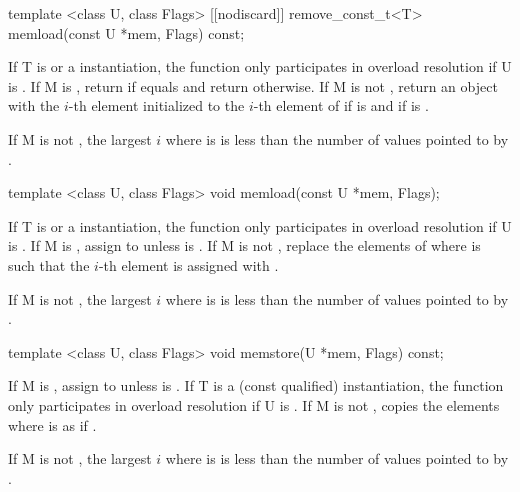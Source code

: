\begin{itemdecl}
template <class U, class Flags>
[[nodiscard]] remove_const_t<T> memload(const U *mem, Flags) const;
\end{itemdecl}
\begin{itemdescr}
  \pnum\remarks If \type T is \bool or a \mask instantiation, the function only participates in overload resolution if \type U is \bool.
  \pnum\returns If \type M is \bool, return  if  equals \true and return  otherwise.
  If \type M is not \bool, return an object with the $i$-th element initialized to the $i$-th element of  if  is \false and  if  is \true \foralli[M::].

  \pnum\requires If \type M is not \bool, the largest $i$ where  is \true is less than the number of values pointed to by .
\end{itemdescr}

\begin{itemdecl}
template <class U, class Flags> void memload(const U *mem, Flags);
\end{itemdecl}
\begin{itemdescr}
  \pnum\remarks If \type T is \bool or a \mask instantiation, the function only participates in overload resolution if \type U is \bool.
  \pnum\effects If \type M is \bool, assign  to  unless  is \false.
  If \type M is not \bool, replace the elements of  where  is \true such that the $i$-th element is assigned with  \foralli[M::].

  \pnum\requires If \type M is not \bool, the largest $i$ where  is \true is less than the number of values pointed to by .
\end{itemdescr}

\begin{itemdecl}
template <class U, class Flags> void memstore(U *mem, Flags) const;
\end{itemdecl}
\begin{itemdescr}
  \pnum\effects If \type M is \bool, assign  to  unless  is \false.
  \pnum\remarks If \type T is a (const qualified) \mask instantiation, the function only participates in overload resolution if \type U is \bool.
  If \type M is not \bool, copies the elements  where  is \true as if  \foralli[M::].

  \pnum\requires If \type M is not \bool, the largest $i$ where  is \true is less than the number of values pointed to by .
\end{itemdescr}

